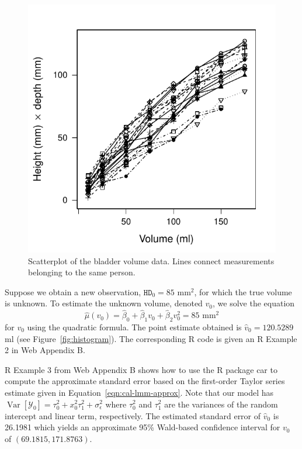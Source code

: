\documentclass[useAMS,usenatbib,usegraphicx,referee]{biom}\usepackage[]{graphicx}\usepackage[]{color}
\newenvironment{knitrout}{}{} %
\newcommand{\var}{\operatorname{Var}}
\newcommand{\code}[1]{\texttt{#1}}
\newcommand{\proglang}[1]{\textsf{#1}}
\newcommand{\pkg}[1]{{\fontseries{b}\selectfont #1}}
\begin{document}
\begin{knitrout}
\color{fgcolor}\begin{figure}[]


{\centering \includegraphics[width=0.8\linewidth]{figure/bladder-spaghetti} 

}

\caption[Scatterplot of the bladder volume data]{Scatterplot of the bladder volume data. Lines connect measurements belonging to the same person.\label{fig:bladder-spaghetti}}
\end{figure}


\end{knitrout}


Suppose we obtain a new observation, $\code{HD}_0 = 85 \text{ mm}^2$, for which the true volume is unknown. To estimate the unknown volume, denoted $v_0$, we solve the equation 
\[
  \widehat{\mu}\left(v_0\right) = \widehat{\beta}_0 + \widehat{\beta}_1v_0 + \widehat{\beta}_2v_0^2 = 85 \text{ mm}^2
\]
for $v_0$ using the quadratic formula. The point estimate obtained is $\widehat{v}_0 = 120.5289$ ml (see Figure~\ref{fig:histogram}). The corresponding R code is given an R Example 2 in Web Appendix B.




R Example 3 from Web Appendix B shows how to use the \proglang{R} package \pkg{car} to compute the approximate standard error based on the first-order Taylor series estimate given in Equation~\eqref{eqn:cal-lmm-approx}. Note that our model has $\var\left[\mathscr{Y}_0\right] = \tau_0^2 + x_0^2\tau_1^2 + \sigma_\epsilon^2$ where $\tau_0^2$ and $\tau_1^2$ are the variances of the random intercept and linear term, respectively. The estimated standard error of $\widehat{v}_0$ is 26.1981 which yields an approximate 95\% Wald-based confidence interval for $v_0$ of $(69.1815, 171.8763)$.
\end{document}
